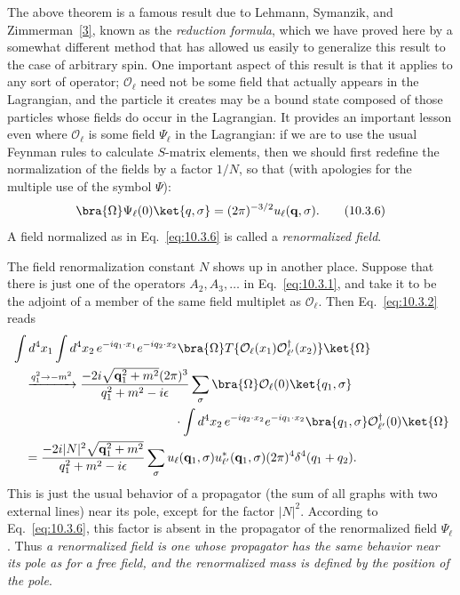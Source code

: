 The above theorem is a famous result due to Lehmann, Symanzik, and
Zimmerman~\hyperref[ref:10.3]{[3]}, known as the \emph{reduction formula},
which we have proved here by a somewhat different method that has allowed us
easily to generalize this result to the case of arbitrary spin. One important
aspect of this result is that it applies to any sort of operator;
$\mathcal O_\ell$ need not be some field that actually appears in the
Lagrangian, and the particle it creates may be a bound state composed of those
particles whose fields do occur in the Lagrangian. It provides an important
lesson even where $\mathcal O_\ell$ is some field $\Psi_\ell$ in the
Lagrangian: if we are to use the usual Feynman rules to calculate $S$-matrix
elements, then we should first redefine the normalization of the fields by a
factor $1/N$, so that (with apologies for the multiple use of the symbol
$\Psi$):
\begin{equation}
\bra{\Omega}\Psi_\ell(0)\ket{q,\sigma}
=(2\pi)^{-3/2}u_\ell(\mathbf q,\sigma).
\tag{10.3.6}\label{eq:10.3.6}
\end{equation}
A field normalized as in Eq.~\eqref{eq:10.3.6} is called a
\emph{renormalized field}.

The field renormalization constant $N$ shows up in another place. Suppose that
there is just one of the operators $A_2,A_3,\ldots$ in Eq.~\eqref{eq:10.3.1},
and take it to be the adjoint of a member of the same field multiplet as
$\mathcal O_\ell$. Then Eq.~\eqref{eq:10.3.2} reads
\begin{align*}
&\int d^4x_1\int d^4x_2\,e^{-iq_1\cdot x_1}e^{-iq_2\cdot x_2}
\bra{\Omega}T\{\mathcal O_\ell(x_1)\mathcal O_{\ell'}^\dagger(x_2)\}
\ket{\Omega}
\\
&\quad\xrightarrow{q_1^2\to-m^2}
\frac{-2i\sqrt{\mathbf q_1^2+m^2}(2\pi)^3}
{q_1^2+m^2-i\epsilon}
\sum_\sigma\bra{\Omega}\mathcal O_\ell(0)\ket{q_1,\sigma}
\\
&\hspace{46mm}\cdot\int d^4x_2\,e^{-iq_2\cdot x_2}e^{-iq_1\cdot x_2}
\bra{q_1,\sigma}\mathcal O_{\ell'}^\dagger(0)\ket{\Omega}
\\
&\quad=
\frac{-2i|N|^2\sqrt{\mathbf q_1^2+m^2}}
{q_1^2+m^2-i\epsilon}
\sum_\sigma u_\ell(\mathbf q_1,\sigma)u_{\ell'}^*(\mathbf q_1,\sigma)
(2\pi)^4\delta^4(q_1+q_2).
\end{align*}
This is just the usual behavior of a propagator (the sum of all graphs with two
external lines) near its pole, except for the factor $|N|^2$. According to
Eq.~\eqref{eq:10.3.6}, this factor is absent in the propagator of the
renormalized field $\Psi_\ell$. Thus \emph{a renormalized field is one whose
propagator has the same behavior near its pole as for a free field, and the
renormalized mass is defined by the position of the pole}.

